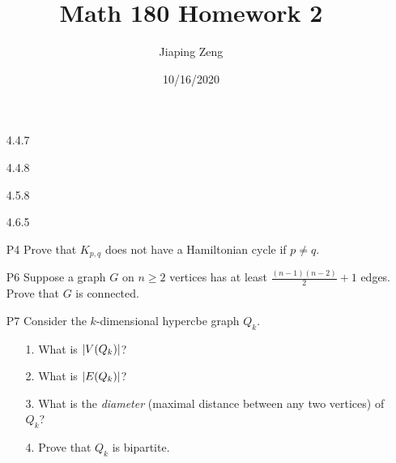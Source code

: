 \documentclass{article}
\title{Math 180 Homework 2}
\date{10/16/2020}
\author{Jiaping Zeng}
\begin{document}
\maketitle

\begin{itemize}
    \item [4.4.7]
    \item [4.4.8]
    \item [4.5.8]
    \item [4.6.5]
    \item [P4] Prove that $K_{p,q}$ does not have a Hamiltonian cycle if $p\neq q$.
    \item [P6] Suppose a graph $G$ on $n\geq 2$ vertices has at least $\frac{(n-1)(n-2)}{2}+1$ edges. Prove that $G$ is connected.
    \item [P7] Consider the $k$-dimensional hypercbe graph $Q_k$.\begin{itemize}
        \item [1.] What is $\abs{V(Q_k)}$?
        \item [2.] What is $\abs{E(Q_k)}$?
        \item [3.] What is the \textit{diameter} (maximal distance between any two vertices) of $Q_k$?
        \item [4.] Prove that $Q_k$ is bipartite.
    \end{itemize}
\end{itemize}
\end{document}
